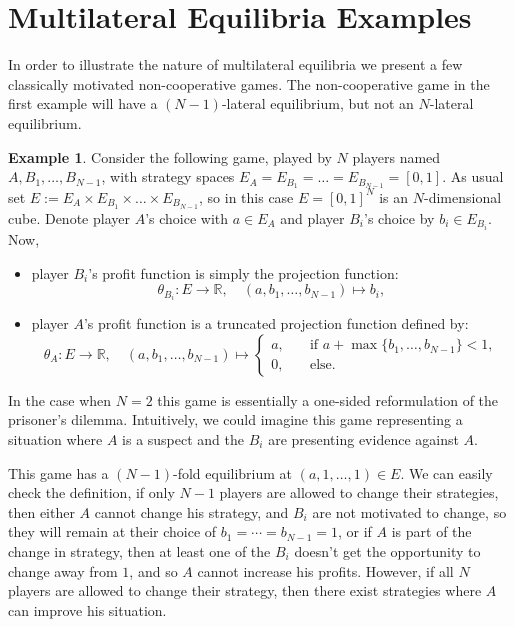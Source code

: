 \documentclass[a4paper,11pt,reqno,english]{amsart}
\theoremstyle{plain}
\theoremstyle{definition}
\newtheorem{example}[theorem]{Example}
\begin{document}
\section{Multilateral Equilibria Examples}
In order to illustrate the nature of multilateral equilibria we present a few classically motivated non-cooperative games.
The non-cooperative game in the first example will have a $(N-1)$-lateral equilibrium, but not an $N$-lateral equilibrium.

\begin{example} 
	\label{ex:GameWithNoKFoldNashEquilibrium}
	Consider the following game, played by $N$ players named $A,B_1,\dots,B_{N-1}$, with strategy spaces $E_{A} = E_{B_1} = \dots = E_{B_{N-1}} = [0,1]$.
	As usual set $E :=E_{A}\times E_{B_1}\times\dots\times E_{B_{N-1}}$, so in this case $E=[0,1]^N$ is an $N$-dimensional cube.
	Denote player $A$'s choice with $a\in E_A$ and player $B_i$'s choice by $b_i\in E_{B_i}$.
	Now,
	\begin{itemize}[\quad --]
		\item player $B_i$'s profit function is simply the projection function:
		      \begin{displaymath}
			      \theta_{B_i}\colon E\longrightarrow \mathbb{R}, \quad (a,b_1,\dots,b_{N-1}) \longmapsto b_i,
		      \end{displaymath}
		\item player $A$'s profit function is a truncated projection function defined by:
		      \begin{displaymath}
			      \theta_{A}\colon E\longrightarrow \mathbb{R}, \quad (a,b_1,\dots,b_{N-1}) \longmapsto \begin{cases}
				      a, \quad & \text{if } a + \max\{b_1,\dots,b_{N-1}\} < 1, \\
				      0, \quad & \text{else.}
			      \end{cases}
		      \end{displaymath}
	\end{itemize}
	In the case when $N=2$ this game is essentially a one-sided reformulation of the prisoner's dilemma.
	Intuitively, we could imagine this game representing a situation where $A$ is a suspect and the $B_i$ are presenting evidence against $A$.

	\medskip
	This game has a $(N-1)$-fold equilibrium at $(a,1,\dots,1) \in E$.
	We can easily check the definition, if only $N-1$ players are allowed to change their strategies, then either $A$ cannot change his strategy, and $B_i$ are not motivated to change, so they will remain at their choice of $b_1=\cdots=b_{N-1}=1$, or if $A$ is part of the change in strategy, then at least one of the $B_i$ doesn't get the opportunity to change away from $1$, and so $A$ cannot increase his profits.
	However, if all $N$ players are allowed to change their strategy, then there exist strategies where $A$ can improve his situation.


\end{example}
\end{document}

